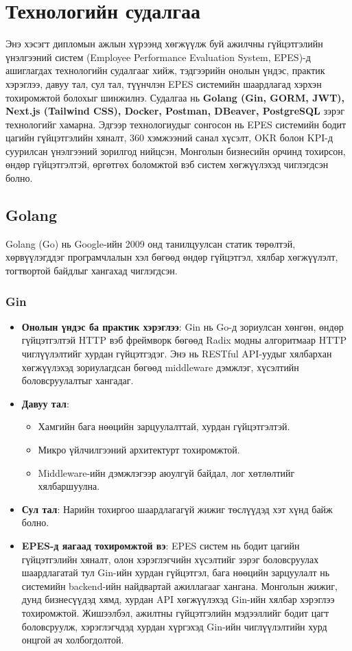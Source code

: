 \newpage
\section{Технологийн судалгаа}
Энэ хэсэгт дипломын ажлын хүрээнд хөгжүүлж буй ажилчны гүйцэтгэлийн үнэлгээний систем (Employee Performance Evaluation System, EPES)-д ашиглагдах технологийн 
судалгааг хийж, тэдгээрийн онолын үндэс, практик хэрэглээ, давуу тал, сул тал, түүнчлэн EPES системийн шаардлагад хэрхэн тохиромжтой болохыг шинжилнэ. 
Судалгаа нь \textbf{Golang (Gin, GORM, JWT), Next.js (Tailwind CSS), Docker, Postman, DBeaver, PostgreSQL} зэрэг технологийг хамарна. Эдгээр технологиудыг сонгосон нь 
EPES системийн бодит цагийн гүйцэтгэлийн хяналт, 360 хэмжээний санал хүсэлт, OKR болон KPI-д суурилсан үнэлгээний зорилгод нийцсэн, Монголын бизнесийн орчинд тохирсон, 
өндөр гүйцэтгэлтэй, өргөтгөх боломжтой вэб систем хөгжүүлэхэд чиглэгдсэн болно.

\subsection{Golang}
Golang (Go) нь Google-ийн 2009 онд танилцуулсан статик төрөлтэй, хөрвүүлэгддэг програмчлалын хэл бөгөөд өндөр гүйцэтгэл, хялбар хөгжүүлэлт, тогтвортой байдлыг хангахад чиглэгдсэн.

\subsubsection{Gin}
\begin{itemize}
    \item \textbf{Онолын үндэс ба практик хэрэглээ}: Gin нь Go-д зориулсан хөнгөн, өндөр гүйцэтгэлтэй HTTP вэб фреймворк бөгөөд Radix модны алгоритмаар HTTP 
    чиглүүлэлтийг хурдан гүйцэтгэдэг. Энэ нь RESTful API-уудыг хялбархан хөгжүүлэхэд зориулагдсан бөгөөд middleware дэмжлэг, хүсэлтийн боловсруулалтыг хангадаг.
    \item \textbf{Давуу тал}:
    \begin{itemize}
        \item Хамгийн бага нөөцийн зарцуулалттай, хурдан гүйцэтгэлтэй.
        \item Микро үйлчилгээний архитектурт тохиромжтой.
        \item Middleware-ийн дэмжлэгээр аюулгүй байдал, лог хөтлөлтийг хялбаршуулна.
    \end{itemize}
    \item \textbf{Сул тал}: Нарийн тохиргоо шаардлагагүй жижиг төслүүдэд хэт хүнд байж болно.
    \item \textbf{EPES-д яагаад тохиромжтой вэ}: EPES систем нь бодит цагийн гүйцэтгэлийн хяналт, олон хэрэглэгчийн хүсэлтийг зэрэг боловсруулах шаардлагатай 
    тул Gin-ийн хурдан гүйцэтгэл, бага нөөцийн зарцуулалт нь системийн backend-ийн найдвартай ажиллагааг хангана. Монголын жижиг, дунд бизнесүүдэд хямд, хурдан 
    API хөгжүүлэхэд Gin-ийн хялбар хэрэглээ тохиромжтой. Жишээлбэл, ажилтны гүйцэтгэлийн мэдээллийг бодит цагт боловсруулж, хэрэглэгчдэд хурдан хүргэхэд Gin-ийн 
    чиглүүлэлтийн хурд онцгой ач холбогдолтой.
\end{itemize}

